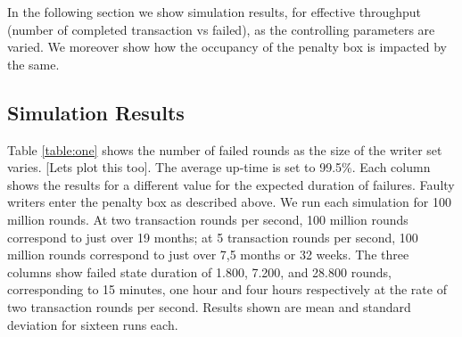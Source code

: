 \documentclass[10pt]{article}
\begin{document}





In the following section we show simulation results, for effective throughput (number of completed transaction vs failed), as the controlling parameters are varied. We moreover show how the occupancy of the penalty box is impacted by the same.




\subsection{Simulation Results}
\label{simulation-res}
Table \ref{table:one} shows the number of failed rounds as the size of the writer set varies. [Lets plot this too]. The average up-time is set to 99.5\%. Each column shows the results for a different value for the expected duration of failures. Faulty writers enter the penalty box as described above. We run each simulation for 100 million rounds. At two transaction rounds per second, 100 million rounds correspond to just over 19 months; at 5 transaction rounds per second, 100 million rounds correspond to just over 7,5 months or 32 weeks. The three columns show failed state duration of 1.800, 7.200, and 28.800 rounds, corresponding to 15 minutes, one hour and four hours respectively at the rate of two transaction rounds per second. Results shown are mean and standard deviation for sixteen runs each.
\end{document}
